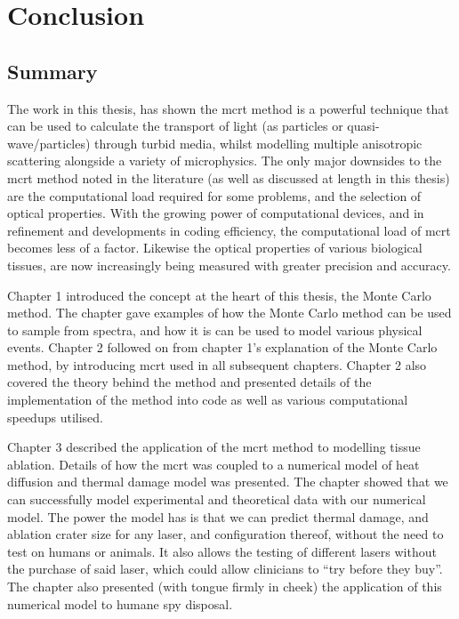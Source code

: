 \chapter{Conclusion}

\section{Summary}

The work in this thesis, has shown the \gls*{mcrt} method is a powerful technique that can be used to calculate the transport of light (as particles or quasi-wave/particles) through turbid media, whilst modelling multiple anisotropic scattering alongside a variety of microphysics.
The only major downsides to the \gls*{mcrt} method noted in the literature (as well as discussed at length in this thesis) are the computational load required for some problems, and the selection of optical properties.
With the growing power of computational devices, and in refinement and developments in coding efficiency, the computational load of \gls*{mcrt} becomes less of a factor.
Likewise the optical properties of various biological tissues, are now increasingly being measured with greater precision and accuracy.

\medskip

Chapter 1 introduced the concept at the heart of this thesis, the Monte Carlo method.
The chapter gave examples of how the Monte Carlo method can be used to sample from spectra, and how it is can be used to model various physical events.
Chapter 2 followed on from chapter 1's explanation of the Monte Carlo method, by introducing \gls*{mcrt} used in all subsequent chapters.
Chapter 2 also covered the theory behind the method and presented details of the implementation of the method into code as well as various computational speedups utilised.

\medskip

Chapter 3 described the application of the \gls*{mcrt} method to modelling tissue ablation.
Details of how the \gls*{mcrt} was coupled to a numerical model of heat diffusion and thermal damage model was presented.
The chapter showed that we can successfully model experimental and theoretical data with our numerical model.
The power the model has is that we can predict thermal damage, and ablation crater size for any laser, and configuration thereof, without the need to test on humans or animals.
It also allows the testing of different lasers without the purchase of said laser, which could allow clinicians to ``try before they buy''.
The chapter also presented (with tongue firmly in cheek) the application of this numerical model to humane spy disposal.

